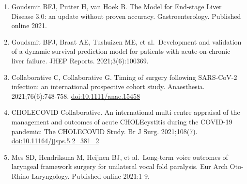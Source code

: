 \documentclass[11pt,english,]{book} %
\begin{document}
\begin{enumerate}
\item
  Goudsmit BFJ, Putter H, van Hoek B. The Model for End-stage Liver Disease 3.0: an update without proven accuracy. Gastroenterology. Published online 2021.
\item
  Goudsmit BFJ, Braat AE, Tushuizen ME, et al.~Development and validation of a dynamic survival prediction model for patients with acute-on-chronic liver failure. JHEP Reports. 2021;3(6):100369.
\item
  Collaborative C, Collaborative G. Timing of surgery following SARS-CoV-2 infection: an international prospective cohort study. Anaesthesia. 2021;76(6):748-758. \url{doi:10.1111/anae.15458}
\item
  CHOLECOVID Collaborative. An international multi-centre appraisal of the management and outcomes of acute CHOLEcystitis during the COVID-19 pandemic: The CHOLECOVID Study. Br J Surg. 2021;108(7). \url{doi:10.11164/jjsps.5.2_381_2}
\item
  Mes SD, Hendriksma M, Heijnen BJ, et al.~Long-term voice outcomes of laryngeal framework surgery for unilateral vocal fold paralysis. Eur Arch Oto-Rhino-Laryngology. Published online 2021:1-9.
\end{enumerate}

\backmatter
\end{document}
